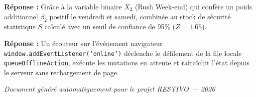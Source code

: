 \documentclass[10pt,a4paper]{article}
\begin{document}
\begin{subtlebox}
\textbf{Réponse :} Grâce à la variable binaire $X_2$ (Rush Week-end) qui confère un poids additionnel $\beta_2$ positif le vendredi et samedi, combinée au stock de sécurité statistique $S$ calculé avec un seuil de confiance de 95\% ($Z=1.65$).
\end{subtlebox}

\begin{subtlebox}
\textbf{Réponse :} Un écouteur sur l'événement navigateur \texttt{window.addEventListener('online')} déclenche le défilement de la file locale \texttt{queueOfflineAction}, exécute les mutations en attente et rafraîchit l'état depuis le serveur sans rechargement de page.
\end{subtlebox}

\vspace{8pt}
\begin{center}
    \small \textcolor{restivogray}{\textit{Document généré automatiquement pour le projet RESTIVO — 2026}}
\end{center}
\end{document}
